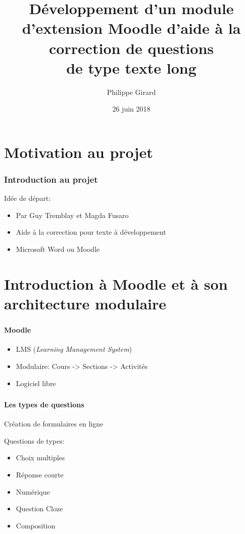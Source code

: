 \documentclass{beamer}
\title[Pr\'esentation du projet de ma\^itrise]{D\'eveloppement d'un module d'extension Moodle d'aide \`a la correction de questions\\de type \og texte long \fg{} }
\author{Philippe Girard}
\institute{Universit\'e du Qu\'ebec \`a Montr\'eal}
\date{26 juin 2018}
\begin{document}
  \begin{frame}[plain]
  \titlepage
  \end{frame}
  
  \begin{frame}[plain]
  \tableofcontents[hideallsubsections]
  \end{frame}
  
  \section[Introduction]{Motivation au projet}
  \begin{frame}
  \frametitle{Introduction au projet}
  Id\'ee de d\'epart:
  \begin{itemize}
    \item Par Guy Tremblay et Magda Fusaro
    \item Aide \`a la correction pour texte \`a d\'eveloppement
    \item Microsoft Word ou Moodle
  \end{itemize}
  \end{frame}
  
  \section[Moodle]{Introduction \`a Moodle et \`a son architecture modulaire}
  \begin{frame}
  \frametitle{\insertsection}
  \framesubtitle{Moodle}
  \begin{itemize}
    \item LMS (\textit{Learning Management System})
    \item Modulaire: Cours -> Sections -> Activit\'es
    \item Logiciel libre
  \end{itemize}
  \end{frame}
  
  \begin{frame}
  \frametitle{\insertsection}
  \framesubtitle{Les types de questions}
  Cr\'eation de formulaires en ligne
  
  \medskip
  
  Questions de types:
  \begin{itemize}
    \item Choix multiples
    \item R\'eponse courte
    \item Num\'erique
    \item Question Cloze
    \item Composition
  \end{itemize}
  \end{frame}
  
\end{document}
